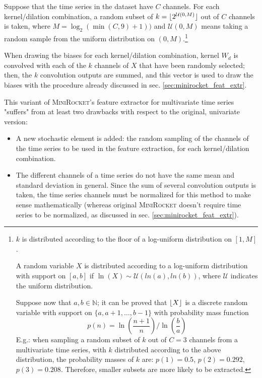Suppose that the time series in the dataset have $C$ channels. For each kernel/dilation combination, a random subset of $k = \lfloor2^{\mathcal{U}(0,M)}\rfloor$ out of $C$ channels is taken, where $M = \log_2(\min(C,9)+1))$ and $\mathcal{U}(0,M)$ means taking a random sample from the uniform distribution on $(0,M)$.\footnote{$k$ is distributed according to the floor of a log-uniform distribution on $[1,M]$.

A random variable $X$ is distributed according to a log-uniform distribution with support on $[a,b]$ if $\ln{(X)}\sim\mathcal{U}(ln(a),ln(b))$, where $\mathcal{U}$ indicates the uniform distribution. \cite{loguniform}

Suppose now that $a,b\in\mathbb{N}$; it can be proved that $\lfloor X\rfloor$ is a discrete random variable with support on $\{a, a+1, \dots, b-1\}$ with probability mass function
\[
p(n) = \ln\left(\frac{n+1}{n}\right) / \ln\left(\frac{b}{a}\right)
\]
E.g.: when sampling a random subset of $k$ out of $C=3$ channels from a multivariate time series, with $k$ distributed according to the above distribution, the probability masses of $k$ are: $p(1)=0.5$, $p(2)=0.292$, $p(3)=0.208$. Therefore, smaller subsets are more likely to be extracted.
}

When drawing the biases for each kernel/dilation combination, kernel $W_d$ is convolved with each of the $k$ channels of $X$ that have been randomly selected; then, the $k$ convolution outputs are summed, and this vector is used to draw the biases with the procedure already discussed in sec. \ref{sec:minirocket_feat_extr}.

This variant of \textsc{MiniRocket}'s feature extractor for multivariate time series "suffers" from at least two drawbacks with respect to the original, univariate version:
\begin{itemize}
\item A new stochastic element is added: the random sampling of the channels of the time series to be used in the feature extraction, for each kernel/dilation combination.
\item The different channels of a time series do not have the same mean and standard deviation in general. Since the sum of several convolution outputs is taken, the time series channels must be normalized for this method to make sense mathematically (whereas original \textsc{MiniRocket} doesn't require time series to be normalized, as discussed in sec. \ref{sec:minirocket_feat_extr}).
\end{itemize}



